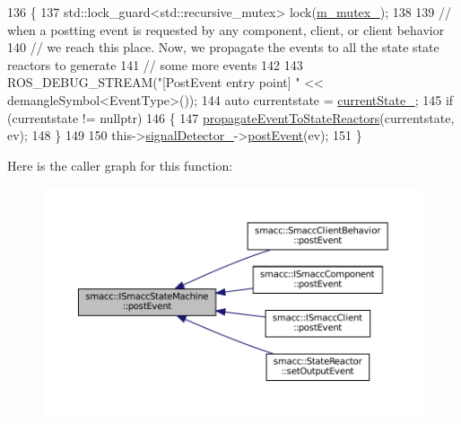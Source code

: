 \begin{DoxyCode}
136 \{
137   std::lock\_guard<std::recursive\_mutex> lock(\hyperlink{classsmacc_1_1ISmaccStateMachine_aac785541646e5c517273bf31072505a1}{m\_mutex\_});
138 
139   \textcolor{comment}{// when a postting event is requested by any component, client, or client behavior}
140   \textcolor{comment}{// we reach this place. Now, we propagate the events to all the state state reactors to generate}
141   \textcolor{comment}{// some more events}
142 
143   ROS\_DEBUG\_STREAM(\textcolor{stringliteral}{"[PostEvent entry point] "} << demangleSymbol<EventType>());
144   \textcolor{keyword}{auto} currentstate = \hyperlink{classsmacc_1_1ISmaccStateMachine_a9c6e7745205bcce80a301f2fbe8f7e99}{currentState\_};
145   \textcolor{keywordflow}{if} (currentstate != \textcolor{keyword}{nullptr})
146   \{
147     \hyperlink{classsmacc_1_1ISmaccStateMachine_a3d369c7cff22632ca85a8656000ba19c}{propagateEventToStateReactors}(currentstate, ev);
148   \}
149 
150   this->\hyperlink{classsmacc_1_1ISmaccStateMachine_a3982eb671f5f001cb047d3a467789986}{signalDetector\_}->\hyperlink{classsmacc_1_1SignalDetector_a6ab99d99cef8d101e39797a72daeb2b7}{postEvent}(ev);
151 \}
\end{DoxyCode}
Here is the caller graph for this function\+:
\nopagebreak
\begin{figure}[H]
\begin{center}
\leavevmode
\includegraphics[width=350pt]{classsmacc_1_1ISmaccStateMachine_ad80cdd7bbc9a9f3b221c625754fed1ed_icgraph}
\end{center}
\end{figure}
\mbox{\label{classsmacc_1_1ISmaccStateMachine_a1549189caf29520514e677ca46f57348}} 
